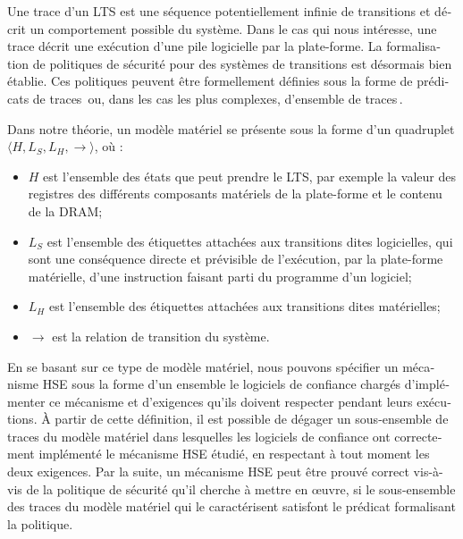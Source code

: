\begin{otherlanguage}{french}
  Une trace d’un LTS est une séquence potentiellement infinie de transitions et
  décrit un comportement possible du système. Dans le cas qui nous intéresse,
  une trace décrit une exécution d’une pile logicielle par la plate-forme.
  La formalisation de politiques de sécurité pour des systèmes de transitions
  est désormais bien établie.
  Ces politiques peuvent être formellement définies sous la forme de prédicats
  de
  traces\,\cite{lamport1977proving,lamport1985logical,lamport1985logical,alpern1985liveness}
  ou, dans les cas les plus complexes, d’ensemble de
  traces\,\cite{clarkson2010hyperproperties}.

  Dans notre théorie, un modèle matériel se présente sous la forme d’un
  quadruplet \( \langle H, L_S, L_H, \rightarrow \rangle \), où :
  \begin{itemize}
  \item \( H \) est l’ensemble des états que peut prendre le LTS, par exemple la
    valeur des registres des différents composants matériels de la plate-forme
    et le contenu de la DRAM;
  \item \( L_S \) est l’ensemble des étiquettes attachées aux transitions dites
    logicielles, qui sont une conséquence directe et prévisible de l’exécution,
    par la plate-forme matérielle, d’une instruction faisant parti du programme
    d’un logiciel;
  \item \( L_H \) est l’ensemble des étiquettes attachées aux transitions dites
    matérielles;
  \item \( \rightarrow \) est la relation de transition du système.
  \end{itemize}

  En se basant sur ce type de modèle matériel, nous pouvons spécifier un
  mécanisme HSE sous la forme d’un ensemble le logiciels de confiance chargés
  d’implémenter ce mécanisme et d’exigences qu’ils doivent respecter pendant
  leurs exécutions.
  À partir de cette définition, il est possible de dégager un sous-ensemble de
  traces du modèle matériel dans lesquelles les logiciels de confiance ont
  correctement implémenté le mécanisme HSE étudié, en respectant à tout moment
  les deux exigences.
  Par la suite, un mécanisme HSE peut être prouvé correct vis-à-vis de la
  politique de sécurité qu’il cherche à mettre en œuvre, si le sous-ensemble des
  traces du modèle matériel qui le caractérisent satisfont le prédicat
  formalisant la politique.


\end{otherlanguage}
